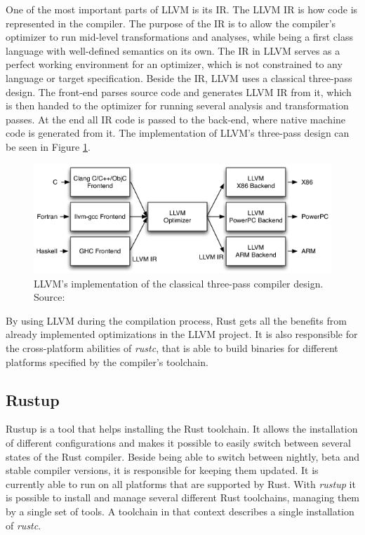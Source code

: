 One of the most important parts of \ac{LLVM} is its \ac{IR}. The \ac{LLVM} \ac{IR} is how code is represented in the compiler. The purpose of the \ac{IR} is to allow the compiler's optimizer to run mid-level transformations and analyses, while being a first class language with well-defined semantics on its own. The \ac{IR} in \ac{LLVM} serves as a perfect working environment for an optimizer, which is not constrained to any language or target specification. Beside the \ac{IR}, \ac{LLVM} uses a classical three-pass design. The front-end parses source code and generates \ac{LLVM} \ac{IR} from it, which is then handed to the optimizer for running several analysis and transformation passes. At the end all \ac{IR} code is passed to the back-end, where native machine code is generated from it. The implementation of \ac{LLVM}'s three-pass design can be seen in Figure \ref{fig:llvm_design}.

\begin{figure}[h!]
	\centering \includegraphics[width=\linewidth]{PICs/llvm_design.png}
	\caption{LLVM's implementation of the classical three-pass compiler design. Source: \cite{LLVM_ARCH}}
	\label{fig:llvm_design}
\end{figure}


\noindent
By using \ac{LLVM} during the compilation process, Rust gets all the benefits from already implemented optimizations in the \ac{LLVM} project. It is also responsible for the cross-platform abilities of \textit{rustc}, that is able to build binaries for different platforms specified by the compiler's toolchain. \cite{LLVM_ARCH}


\subsection{Rustup}

Rustup is a tool that helps installing the Rust toolchain. It allows the installation of different configurations and makes it possible to easily switch between several states of the Rust compiler. Beside being able to switch between nightly, beta and stable compiler versions, it is responsible for keeping them updated. It is currently able to run on all platforms that are supported by Rust. With \textit{rustup} it is possible to install and manage several different Rust toolchains, managing them by a single set of tools. A toolchain in that context describes a single installation of \textit{rustc}.


